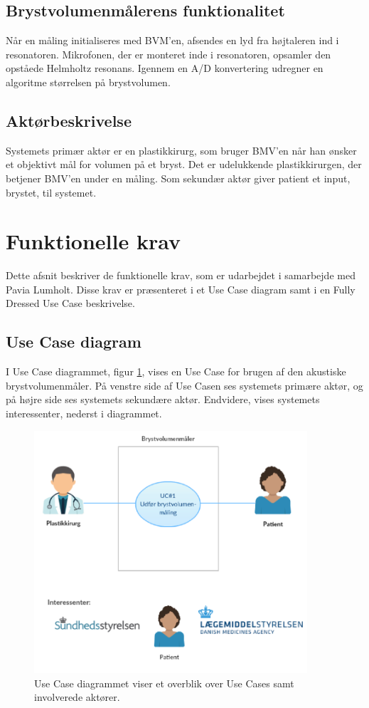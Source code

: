 	
		\subsection{Brystvolumenmålerens funktionalitet}
		Når en måling initialiseres med BVM'en, afsendes en lyd fra højtaleren ind i resonatoren. Mikrofonen, der er monteret inde i resonatoren, opsamler den opståede Helmholtz resonans. Igennem en A/D konvertering udregner en algoritme størrelsen på brystvolumen. 
	
		\subsection{Aktørbeskrivelse}
		Systemets primær aktør er en plastikkirurg, som bruger BMV'en når han ønsker et objektivt mål for volumen på et bryst. Det er udelukkende plastikkirurgen, der  betjener BMV'en under en måling. Som sekundær aktør giver patient et input, brystet, til systemet.
	
	\section{Funktionelle krav}	
	Dette afsnit beskriver de funktionelle krav, som er udarbejdet i samarbejde med Pavia Lumholt. Disse krav er præsenteret i et Use Case diagram samt i en Fully Dressed Use Case beskrivelse.  
	
		\subsection{Use Case diagram}
		I Use Case diagrammet, figur \ref{fig:UC1}, vises en Use Case for brugen af den akustiske brystvolumenmåler. På venstre side af Use Casen ses systemets primære aktør, og på højre side ses systemets sekundære aktør. Endvidere, vises systemets interessenter, nederst i diagrammet.  
	
			\begin{figure}[htb]
				\centering
					\includegraphics[width=4in]{UC1.png}
					\caption{Use Case diagrammet viser et overblik over Use Cases samt involverede aktører.}
					\label{fig:UC1}
			\end{figure}	 
	\pagebreak	
	\newpage	
  
